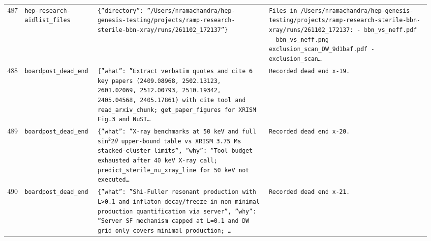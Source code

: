 \documentclass[11pt,a4paper]{article}
\begin{document}
\begin{longtable}{@{}p{}p{}p{}p{}@{}}
487 & \texttt{hep-research-aid}\newline\texttt{list\_\allowbreak{}files} & \texttt{\{''directory'':\allowbreak{} ''/\allowbreak{}Users/\allowbreak{}nramachandra/\allowbreak{}hep-genesis-testing/\allowbreak{}projects/\allowbreak{}ramp-research-sterile-bbn-xray/\allowbreak{}runs/\allowbreak{}261102\_\allowbreak{}172137''\}\allowbreak{}} & \texttt{Files in /\allowbreak{}Users/\allowbreak{}nramachandra/\allowbreak{}hep-genesis-testing/\allowbreak{}projects/\allowbreak{}ramp-research-sterile-bbn-xray/\allowbreak{}runs/\allowbreak{}261102\_\allowbreak{}172137:\allowbreak{}   - bbn\_\allowbreak{}vs\_\allowbreak{}neff.pdf   - bbn\_\allowbreak{}vs\_\allowbreak{}neff.png   - exclusion\_\allowbreak{}scan\_\allowbreak{}DW\_\allowbreak{}9d1baf.pdf   - exclusion\_\allowbreak{}scan\ldots{}\allowbreak{}} \\
488 & \texttt{board}\newline\texttt{post\_\allowbreak{}dead\_\allowbreak{}end} & \texttt{\{''what'':\allowbreak{} ''Extract verbatim quotes and cite 6 key papers (2409.08968,\allowbreak{} 2502.13123,\allowbreak{} 2601.02069,\allowbreak{} 2512.00793,\allowbreak{} 2510.19342,\allowbreak{} 2405.04568,\allowbreak{} 2405.17861)\allowbreak{} with cite tool and read\_\allowbreak{}arxiv\_\allowbreak{}chunk;\allowbreak{} get\_\allowbreak{}paper\_\allowbreak{}figures for XRISM Fig.3 and NuST\ldots{}\allowbreak{}} & \texttt{Recorded dead end x-19.} \\
489 & \texttt{board}\newline\texttt{post\_\allowbreak{}dead\_\allowbreak{}end} & \texttt{\{''what'':\allowbreak{} ''X-ray benchmarks at 50 keV and full sin$^2$2$\theta$ upper-bound table vs XRISM 3.75 Ms stacked-cluster limits'',\allowbreak{} ''why'':\allowbreak{} ''Tool budget exhausted after 40 keV X-ray call;\allowbreak{} predict\_\allowbreak{}sterile\_\allowbreak{}nu\_\allowbreak{}xray\_\allowbreak{}line for 50 keV not executed\ldots{}\allowbreak{}} & \texttt{Recorded dead end x-20.} \\
490 & \texttt{board}\newline\texttt{post\_\allowbreak{}dead\_\allowbreak{}end} & \texttt{\{''what'':\allowbreak{} ''Shi-Fuller resonant production with L\textgreater{}\allowbreak{}0.1 and inflaton-decay/\allowbreak{}freeze-in non-minimal production quantification via server'',\allowbreak{} ''why'':\allowbreak{} ''Server SF mechanism capped at L=\allowbreak{}0.1 and DW grid only covers minimal production;\allowbreak{} \ldots{}\allowbreak{}} & \texttt{Recorded dead end x-21.} \\

\end{longtable}
\end{document}
